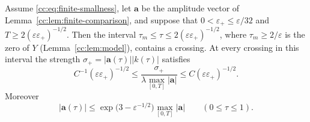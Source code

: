 \begin{proposition}\label{cc:prop:finite-return}
Assume \eqref{cc:eq:finite-smallness}, let $\mathbf a$ be the amplitude
vector of Lemma~\ref{cc:lem:finite-comparison}, and suppose that
$0<\varepsilon_+\le\varepsilon/32$ and
$T\ge2(\varepsilon\varepsilon_+)^{-1/2}$. Then the interval
$\tau_m\le\tau\le2(\varepsilon\varepsilon_+)^{-1/2}$, where
$\tau_m\ge2/\varepsilon$ is the zero of $Y$
(Lemma~\ref{cc:lem:model}), contains a crossing. At every
crossing in this interval the strength
$\sigma_+=|\mathbf a(\tau)||k(\tau)|$ satisfies
\begin{equation}\label{cc:eq:general-return}
 C^{-1}(\varepsilon\varepsilon_+)^{-1/2}
 \le\frac{\sigma_+}{\lambda\max_{[0,T]}|\mathbf a|}
 \le C(\varepsilon\varepsilon_+)^{-1/2}.
\end{equation}
Moreover
\begin{equation}\label{cc:eq:gain}
 |\mathbf a(\tau)|\le\exp\bigl(3-\varepsilon^{-1/2}\bigr)
 \max_{[0,T]}|\mathbf a|\qquad(0\le\tau\le1).
\end{equation}
\end{proposition}
